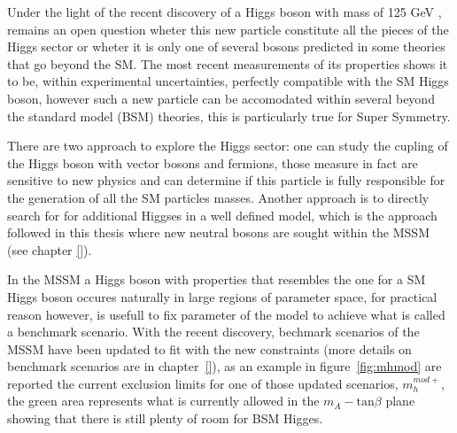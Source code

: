 Under the light of the recent discovery of a Higgs 
boson with mass of 125 GeV \cite{}, remains an open question
wheter this new particle constitute all the pieces of the Higgs
sector or wheter it is only one of several bosons predicted in some theories 
that go beyond the SM. The most recent measurements \cite{} of its
properties shows it to be, within experimental uncertainties, perfectly 
compatible with the SM Higgs boson, however such a new particle can 
be accomodated within several beyond the 
standard model (BSM) theories, this is particularly true for Super Symmetry. 

There are two approach to explore the Higgs sector:
one can study the cupling of the Higgs boson with vector
bosons and fermions, those measure in fact are sensitive to new physics and can determine
if this particle is  fully responsible for
the generation of all the SM particles masses. 
Another approach is to directly search for %
for additional Higgses in a well defined model, which is the approach followed in this
thesis where new neutral bosons are sought within the MSSM (see chapter \ref{}). 

In the MSSM a Higgs boson with properties that  
resembles the one for a SM Higgs boson occures naturally in large regions 
of parameter space, for practical reason however,
is usefull to fix  parameter of the model to achieve what is called a benchmark
scenario. With the recent discovery, bechmark scenarios of the MSSM have been updated to fit
with the new constraints (more details on benchmark scenarios are in chapter~\ref{}), 
as an example in figure~\ref{fig:mhmod} are reported the current exclusion limits
for one of those updated scenarios, $m_{h}^{mod+}$, the green area represents what is currently 
allowed in the $m_{A} - \text{tan}\beta$ plane showing that there is still plenty of room for BSM
Higges.

